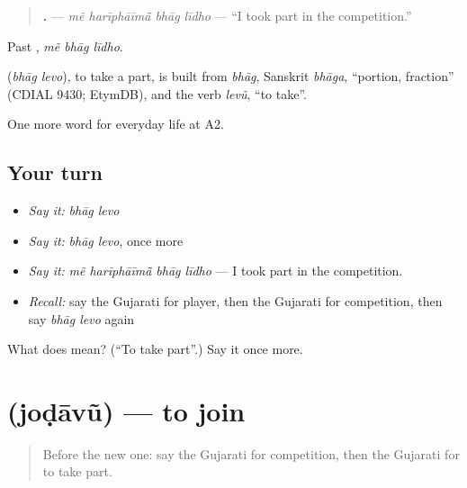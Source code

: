 \begin{quote}
\textbf{   .} — \emph{mẽ harīphāīmā̃ bhāg līdho} — \textquotedblleft{}I took part in the competition.\textquotedblright{}
\end{quote}

Past \textbf{  }, \emph{mẽ bhāg līdho}.

\begin{cousinweb}
\textbf{ } (\emph{bhāg levo}), to take a part, is built from \emph{bhāg}, Sanskrit \emph{bhāga}, \textquotedblleft{}portion, fraction\textquotedblright{} (CDIAL 9430; EtymDB), and the verb \emph{levũ}, \textquotedblleft{}to take\textquotedblright{}.
\end{cousinweb}

\begin{grammarlens}[title={What you've built}]
One more word for everyday life at A2.
\end{grammarlens}

\subsection*{Your turn}
\begin{itemize}
\raggedright
  \item \emph{Say it:} \emph{bhāg levo}
  \item \emph{Say it:} \emph{bhāg levo}, once more
  \item \emph{Say it:} \emph{mẽ harīphāīmā̃ bhāg līdho} — I took part in the competition.
  \item \emph{Recall:} say the Gujarati for player, then the Gujarati for competition, then say \emph{bhāg levo} again
\end{itemize}

\begin{tcolorbox}[breakable,colback=teal!4,colframe=teal!35!black,title={Before you move on}]
What does   mean? (\textquotedblleft{}To take part\textquotedblright{}.) Say it once more.
\end{tcolorbox}
\section[\texorpdfstring{\gu{જોડાવું} (joḍāvũ)}{જોડાવું (joḍāvũ)}]{ (joḍāvũ) — to join}

\label{lesson:GU-C257-jodavu}



\begin{quote}
Before the new one: say the Gujarati for competition, then the Gujarati for to take part.
\end{quote}

